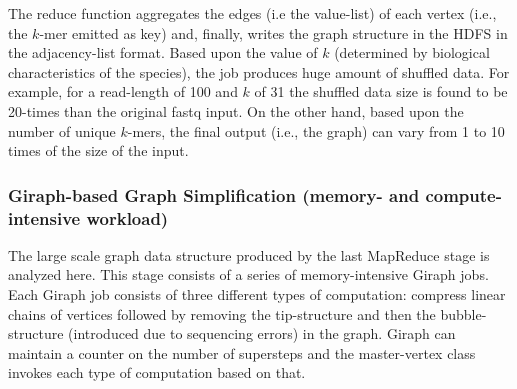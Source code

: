 \documentclass[conference]{IEEEtran}
\begin{document}
The reduce function aggregates the edges (i.e the value-list) of each vertex (i.e., the $k$-mer emitted as key) and, finally, writes the graph structure in the HDFS in the adjacency-list format. 
Based upon the value of $k$ (determined by biological characteristics of the species), the job produces huge amount of shuffled data. 
For example, for a read-length of 100 and $k$ of 31 the shuffled data size is found to be 20-times than the original fastq input. 
On the other hand, based upon the number of unique $k$-mers, the final output (i.e., the graph) can vary from 1 to 10 times of the size of the input. 

\subsubsection {Giraph-based Graph Simplification (memory- and compute-intensive workload)}
The large scale graph data structure produced by the last MapReduce stage is analyzed here.
This stage consists of a series of memory-intensive Giraph jobs. 
Each Giraph job consists of three different types of computation: compress linear chains of vertices followed by removing the tip-structure and then the bubble-structure (introduced due to sequencing errors) in the graph. 
Giraph can maintain a counter on the number of supersteps and the master-vertex class invokes each type of computation based on that.  
\end{document}
